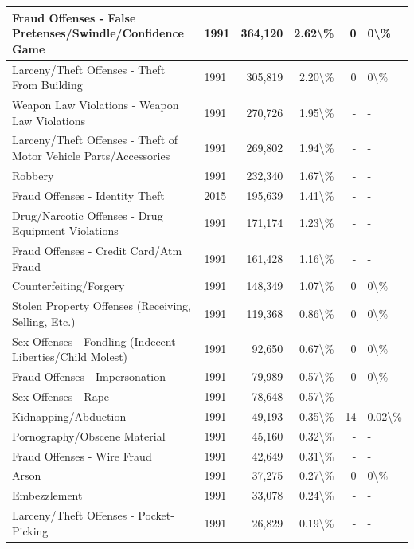 \documentclass[
]{krantz}
\begin{document}
\begin{longtable}[t]{l|l|r|r|r|l}
\hline
Fraud Offenses - False Pretenses/Swindle/Confidence Game & 1991 & 364,120 & 2.62\textbackslash{}\% & 0 & 0\textbackslash{}\%\\
\hline
Larceny/Theft Offenses - Theft From Building & 1991 & 305,819 & 2.20\textbackslash{}\% & 0 & 0\textbackslash{}\%\\
\hline
Weapon Law Violations - Weapon Law Violations & 1991 & 270,726 & 1.95\textbackslash{}\% & - & -\\
\hline
Larceny/Theft Offenses - Theft of Motor Vehicle Parts/Accessories & 1991 & 269,802 & 1.94\textbackslash{}\% & - & -\\
\hline
Robbery & 1991 & 232,340 & 1.67\textbackslash{}\% & - & -\\
\hline
Fraud Offenses - Identity Theft & 2015 & 195,639 & 1.41\textbackslash{}\% & - & -\\
\hline
Drug/Narcotic Offenses - Drug Equipment Violations & 1991 & 171,174 & 1.23\textbackslash{}\% & - & -\\
\hline
Fraud Offenses - Credit Card/Atm Fraud & 1991 & 161,428 & 1.16\textbackslash{}\% & - & -\\
\hline
Counterfeiting/Forgery & 1991 & 148,349 & 1.07\textbackslash{}\% & 0 & 0\textbackslash{}\%\\
\hline
Stolen Property Offenses (Receiving, Selling, Etc.) & 1991 & 119,368 & 0.86\textbackslash{}\% & 0 & 0\textbackslash{}\%\\
\hline
Sex Offenses - Fondling (Indecent Liberties/Child Molest) & 1991 & 92,650 & 0.67\textbackslash{}\% & 0 & 0\textbackslash{}\%\\
\hline
Fraud Offenses - Impersonation & 1991 & 79,989 & 0.57\textbackslash{}\% & 0 & 0\textbackslash{}\%\\
\hline
Sex Offenses - Rape & 1991 & 78,648 & 0.57\textbackslash{}\% & - & -\\
\hline
Kidnapping/Abduction & 1991 & 49,193 & 0.35\textbackslash{}\% & 14 & 0.02\textbackslash{}\%\\
\hline
Pornography/Obscene Material & 1991 & 45,160 & 0.32\textbackslash{}\% & - & -\\
\hline
Fraud Offenses - Wire Fraud & 1991 & 42,649 & 0.31\textbackslash{}\% & - & -\\
\hline
Arson & 1991 & 37,275 & 0.27\textbackslash{}\% & 0 & 0\textbackslash{}\%\\
\hline
Embezzlement & 1991 & 33,078 & 0.24\textbackslash{}\% & - & -\\
\hline
Larceny/Theft Offenses - Pocket-Picking & 1991 & 26,829 & 0.19\textbackslash{}\% & - & -\\

\end{longtable}
\end{document}
